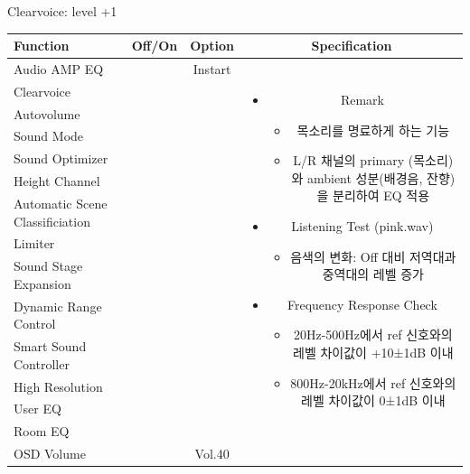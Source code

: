 \documentclass{beamer}
\begin{document}

\begin{frame}[t]{Clearvoice: level +1}
\begin{tiny}
\begin{tabular}{@{}lccc@{}}
\toprule
Function & Off/On & Option & Specification \\
\midrule
Audio AMP EQ & \color{black}{Off} & Instart &
\multirow{14}{60mm}{
\begin{itemize}
\item Remark
	\begin{itemize}
	\item 목소리를 명료하게 하는 기능
	\item L/R 채널의 primary (목소리)와 ambient 성분(배경음, 잔향)을 분리하여 EQ 적용
	\end{itemize}
\item Listening Test (pink.wav)
	\begin{itemize}
	\item 음색의 변화: Off 대비 저역대과 중역대의 레벨 증가
	\end{itemize}
\item Frequency Response Check
  \begin{itemize}
  \item 20Hz-500Hz에서 ref 신호와의 레벨 차이값이 +10±1dB 이내
  \item 800Hz-20kHz에서 ref 신호와의 레벨 차이값이 0±1dB 이내
  \end{itemize}
\end{itemize}
} \\
Clearvoice & \color{blue}{On} & \color{blue}{+1} & \\
Autovolume & \color{black}{Off} & & \\
Sound Mode & \color{black}{Off} & & \\
Sound Optimizer & \color{black}{Off} & & \\
Height Channel & \color{black}{Off} & & \\
Automatic Scene Classificiation & \color{black}{Off} & & \\
Limiter & \color{black}{Off} & & \\
Sound Stage Expansion & \color{black}{Off} & & \\
Dynamic Range Control & \color{black}{Off} & & \\
Smart Sound Controller & \color{black}{Off} & & \\
High Resolution & \color{black}{Off} & & \\
User EQ & \color{black}{Off} & & \\
Room EQ & \color{black}{Off} & & \\
OSD Volume & \color{blue}{On} & Vol.40 & \\
\midrule
\end{tabular}
\end{tiny}


\end{frame}
\end{document}
